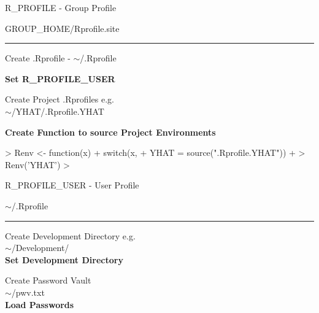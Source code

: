 \documentclass{beamer}
\begin{document}
\begin{frame}{R\_PROFILE - Group Profile}

\begin{center} GROUP\_HOME/Rprofile.site\\ \end{center}
\begin{center}
\rule{4cm}{0.6pt}
\end{center}

\begin{center}Create .Rprofile - $\sim$/.Rprofile\\\end{center}
\textbf{Set R\_PROFILE\_USER\\}

\begin{center}
 Create Project .Rprofiles e.g.\\ $\sim$/YHAT/.Rprofile.YHAT
\end{center}

\textbf{Create Function to source Project Environments \\}
\end{frame}

\begin{Schunk}
\begin{Sinput}
> Renv <- function(x){
+  switch(x,
+        YHAT = source(".Rprofile.YHAT"))
+ }
> Renv('YHAT') 
>  
\end{Sinput}
\end{Schunk}


\begin{frame}{R\_PROFILE\_USER - User Profile}

\begin{center} $\sim$/.Rprofile\\ \end{center}
\begin{center}
\rule{4cm}{0.6pt}
\end{center}

\bigskip

\begin{center}
Create Development Directory e.g.\\ $\sim$/Development/ \\ 
\textbf{Set Development Directory}
\end{center}

\begin{center}
Create Password Vault \\ $\sim$/pwv.txt \\ 
\textbf{Load Passwords}\\
\end{center}

\end{frame}
\end{document}
